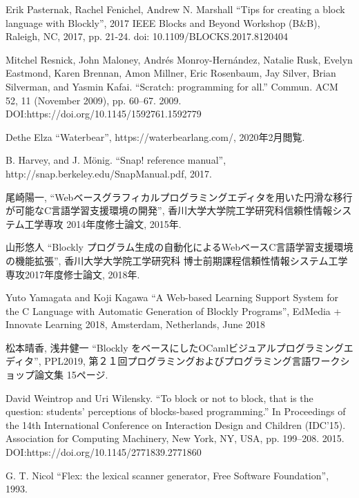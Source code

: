 \documentclass{risepaper}
\begin{document}
\begin{thebibliography}{99} %
                                  
 Erik Pasternak, Rachel Fenichel, Andrew N. Marshall
 ``Tips for creating a block language with Blockly'', 
 2017 IEEE Blocks and Beyond Workshop (B\&B), Raleigh, NC, 2017, pp. 21-24. doi: 10.1109/BLOCKS.2017.8120404

Mitchel Resnick, John Maloney, Andrés Monroy-Hernández, Natalie Rusk, Evelyn Eastmond, Karen Brennan, Amon Millner, Eric Rosenbaum, Jay Silver, Brian Silverman, and Yasmin Kafai. 
``Scratch: programming for all.'' 
Commun. ACM 52, 11 (November 2009), pp. 60–67. 2009. DOI:https://doi.org/10.1145/1592761.1592779
 
 Dethe Elza
 ``Waterbear'', https://waterbearlang.com/, 2020年2月閲覧.
 
B. Harvey, and J. Mönig. 
``Snap! reference manual'', http://snap.berkeley.edu/SnapManual.pdf, 2017.

 尾崎陽一,
 ``Webベースグラフィカルプログラミングエディタを用いた円滑な移行が可能なC言語学習支援環境の開発'', 香川大学大学院工学研究科信頼性情報システム工学専攻 2014年度修士論文, 2015年.
 
 山形悠人
 ``Blockly プログラム生成の自動化によるWebベースC言語学習支援環境の機能拡張'', 香川大学大学院工学研究科
博士前期課程信頼性情報システム工学専攻2017年度修士論文, 2018年.

 Yuto Yamagata and Koji Kagawa
 ``A Web-based Learning Support System for the C Language with Automatic Generation of Blockly Programs'', EdMedia + Innovate Learning 2018, Amsterdam, Netherlands, June 2018
 
 松本晴香, 浅井健一
 ``Blockly をベースにしたOCamlビジュアルプログラミングエディタ'', PPL2019, 第２１回プログラミングおよびプログラミング言語ワークショップ論文集 15ページ.
 
David Weintrop and Uri Wilensky.  
``To block or not to block, that is the question: students’ perceptions of blocks-based programming.'' 
In Proceedings of the 14th International Conference on Interaction Design and Children (IDC'15). Association for Computing Machinery, New York, NY, USA, pp. 199–208. 2015. DOI:https://doi.org/10.1145/2771839.2771860

 G. T. Nicol
 ``Flex: the lexical scanner generator, Free Software Foundation'', 1993.


\end{thebibliography}
\end{document}
